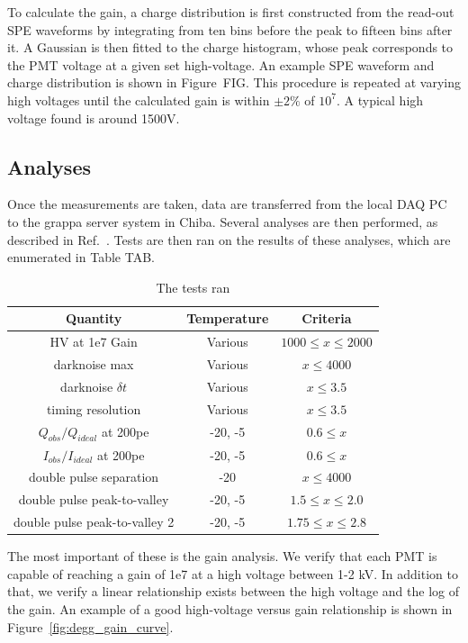 \documentclass[main.tex]{subfiles}
\begin{document}
To calculate the gain, a charge distribution is first constructed from the read-out SPE waveforms by integrating from ten bins before the peak to fifteen bins after it.
A Gaussian is then fitted to the charge histogram, whose peak corresponds to the PMT voltage at a given set high-voltage. An example SPE waveform and charge distribution is shown in Figure~FIG.
This procedure is repeated at varying high voltages until the calculated gain is within $\pm 2\%$ of $10^{7}$.
A typical high voltage found is around 1500V. 

\subsection{Analyses}

Once the measurements are taken, data are transferred from the local DAQ PC to the grappa server system in Chiba. Several analyses are then performed, as described in Ref.~\cite{degg}. 
Tests are then ran on the results of these analyses, which are enumerated in Table TAB. 

\begin{table}
    \centering
    \begin{tabular}{c|cc}\rowcolor{blue!25}
        Quantity & Temperature & Criteria\\\hline
        HV at 1e7 Gain & Various & $1000\leq x \leq 2000$ \\
        darknoise max & Various & $x \leq 4000$ \\
        darknoise $\delta t$ & Various & $x \leq 3.5$ \\        
        timing resolution & Various & $x \leq 3.5$ \\
        $Q_{obs}/Q_{ideal}$ at 200pe & -20, -5 & $0.6\leq x$ \\
        $I_{obs}/I_{ideal}$ at 200pe & -20, -5 & $0.6\leq x$ \\
        double pulse separation & -20 & $x \leq 4000$ \\
        double pulse peak-to-valley & -20, -5 & $1.5\leq x\leq 2.0$ \\
        double pulse peak-to-valley 2 & -20, -5 & $1.75\leq x\leq 2.8$ \\
    \end{tabular}
    \caption{The tests ran}
\end{table}

The most important of these is the gain analysis. 
We verify that each PMT is capable of reaching a gain of 1e7 at a high voltage between 1-2 kV. 
In addition to that, we verify a linear relationship exists between the high voltage and the log of the gain. 
An example of a good high-voltage versus gain relationship is shown in Figure~\ref{fig:degg_gain_curve}.
\end{document}
